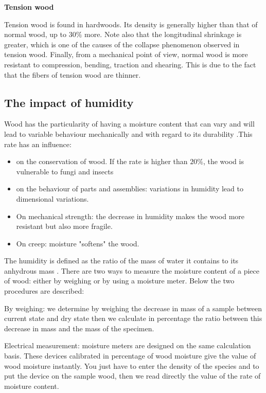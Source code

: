 \smallskip

\textbf{Tension wood}

Tension wood is found in hardwoods. Its density is generally higher than that of normal wood, up to $30 \%$ more. Note also that the longitudinal shrinkage is greater, which is one of the causes of the collapse phenomenon observed in tension wood. Finally, from a mechanical point of view, normal wood is more resistant to compression, bending, traction and shearing. This is due to the fact that the fibers of tension wood are thinner.

\subsection{The impact of humidity}

Wood has the particularity of having a moisture content that can vary and will lead to variable behaviour mechanically and with regard to its durability \cite{Reference6}.This rate has an influence: 

\begin{itemize}
	\item on the conservation of wood. If the rate is higher than $20 \%$, the wood is vulnerable to fungi and insects
	\item on the behaviour of parts and assemblies: variations in humidity lead to dimensional variations.
	\item On mechanical strength: the decrease in humidity makes the wood more resistant but also more fragile.
	\item On creep: moisture "softens" the wood.
\end{itemize}

The humidity is defined as the ratio of the mass of water it contains to its anhydrous mass \cite{Reference3}. There are two ways to measure the moisture content of a piece of wood: either by weighing or by using a moisture meter. Below the two procedures are described:

By weighing: we determine by weighing the decrease in mass of a sample between current state and dry state then we calculate in percentage the ratio between this decrease in mass and the mass of the specimen.

Electrical measurement: moisture meters are designed on the same calculation basis. These devices calibrated in percentage of wood moisture give the value of wood moisture instantly. You just have to enter the density of the species and to put the device on the sample wood, then we read directly the value of the rate of moisture content.

